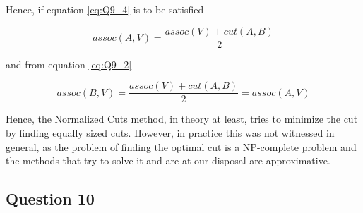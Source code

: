 Hence, if equation \ref{eq:Q9_4} is to be satisfied

\begin{equation}
  assoc(A,V) = \frac{assoc(V) + cut(A,B)}{2}
\end{equation}

and from equation \ref{eq:Q9_2}

\begin{equation}
  assoc(B,V) = \frac{assoc(V) + cut(A,B)}{2} = assoc(A,V)
\end{equation}

Hence, the Normalized Cuts method, in theory at least, tries to minimize the
cut by finding equally sized cuts. However, in practice this was not witnessed
in general, as the problem of finding the optimal cut is a NP-complete problem
and the methods that try to solve it and are at our disposal are approximative.

\subsection{Question 10}
